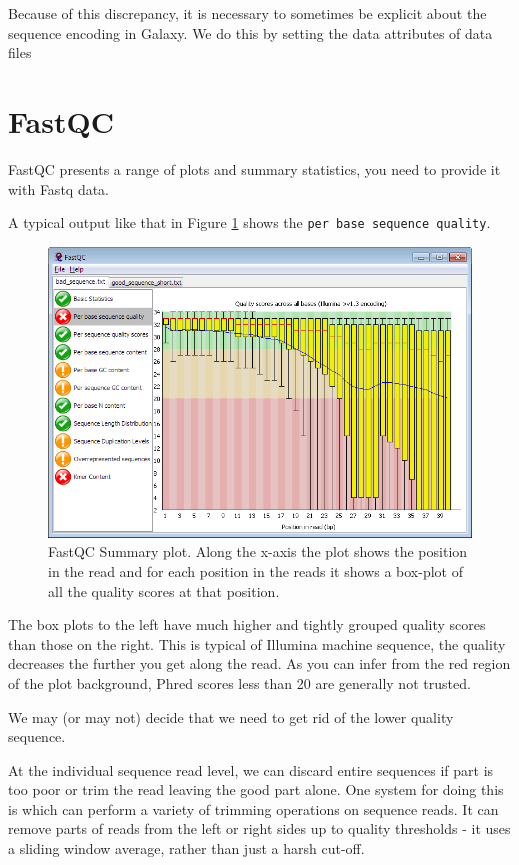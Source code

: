 \documentclass[12pt,]{book}
\begin{document}
Because of this discrepancy, it is necessary to sometimes be explicit
about the sequence encoding in Galaxy. We do this by setting the data
attributes of data files

\section{FastQC}\label{fastqc}

FastQC presents a range of plots and summary statistics, you need to
provide it with Fastq data.

A typical output like that in Figure \ref{fig:fastqc} shows the
\texttt{per\ base\ sequence\ quality}.





\begin{figure}
\includegraphics[width=5.08in]{assets/fastqc} \caption{FastQC Summary plot. Along the x-axis the plot shows
the position in the read and for each position in the reads it shows a
box-plot of all the quality scores at that position.}\label{fig:fastqc}
\end{figure}

The box plots to the left have much higher and tightly grouped quality
scores than those on the right. This is typical of Illumina machine
sequence, the quality decreases the further you get along the read. As
you can infer from the red region of the plot background, Phred scores
less than 20 are generally not trusted.

We may (or may not) decide that we need to get rid of the lower quality
sequence.

At the individual sequence read level, we can discard entire sequences
if part is too poor or trim the read leaving the good part alone. One
system for doing this is \citep{Bolger:2014ek} which can perform a
variety of trimming operations on sequence reads. It can remove parts of
reads from the left or right sides up to quality thresholds - it uses a
sliding window average, rather than just a harsh cut-off.
\end{document}
